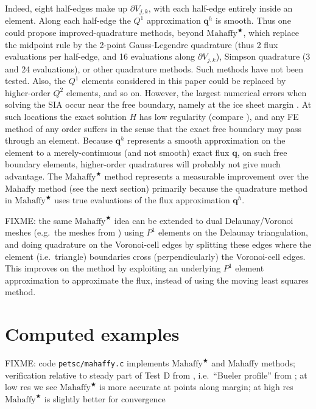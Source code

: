 \documentclass[11pt]{amsart}
\newcommand\bq{\mathbf{q}}
\newcommand{\Mstar}{$\text{Mahaffy}^{\bigstar}$\xspace}
\begin{document}
Indeed, eight half-edges make up $\partial V_{j,k}$, with each half-edge entirely inside an element.  Along each half-edge the $Q^1$ approximation $\bq^h$ is smooth.  Thus one could propose improved-quadrature methods, beyond \Mstar, which replace the midpoint rule by the 2-point Gauss-Legendre quadrature (thus 2 flux evaluations per half-edge, and 16 evaluations along $\partial V_{j,k}$), Simpson quadrature (3 and 24 evaluations), or other quadrature methods.  Such methods have not been tested.  Also, the $Q^1$ elements considered in this paper could be replaced by higher-order $Q^2$ elements, and so on.  However, the largest numerical errors when solving the SIA occur near the free boundary, namely at the ice sheet margin \cite{Bueleretal2005}.  At such locations the exact solution $H$ has low regularity (compare \cite{JouvetBueler2012}), and any FE method of any order suffers in the sense that the exact free boundary may pass through an element.  Because $\bq^h$ represents a smooth approximation on the element to a merely-continuous (and not smooth) exact flux $\bq$, on such free boundary elements, higher-order quadratures will probably not give much advantage.  The \Mstar method represents a measurable improvement over the Mahaffy method (see the next section) primarily because the quadrature method in \Mstar uses true evaluations of the flux approximation $\bq^h$.

FIXME: the same \Mstar idea can be extended to dual Delaunay/Voronoi meshes (e.g.~the meshes from \cite{EgholmNielsen2010,Ringleretal2013}) using $P^1$ elements on the Delaunay triangulation, and doing quadrature on the Voronoi-cell edges by splitting these edges where the element (i.e.~triangle) boundaries cross (perpendicularly) the Voronoi-cell edges.  This improves on the \cite{EgholmNielsen2010} method by exploiting an underlying $P^1$ element approximation to approximate the flux, instead of using the moving least squares method.


\section{Computed examples} \label{sec:examples}

FIXME: code \texttt{petsc/mahaffy.c} implements \Mstar and Mahaffy methods; verification relative to steady part of Test D from \cite{Bueleretal2005}, i.e.~``Bueler profile'' from \cite{vanderVeen2013}; at low res we see \Mstar is more accurate at points along margin; at high res \Mstar is slightly better for convergence
\end{document}
